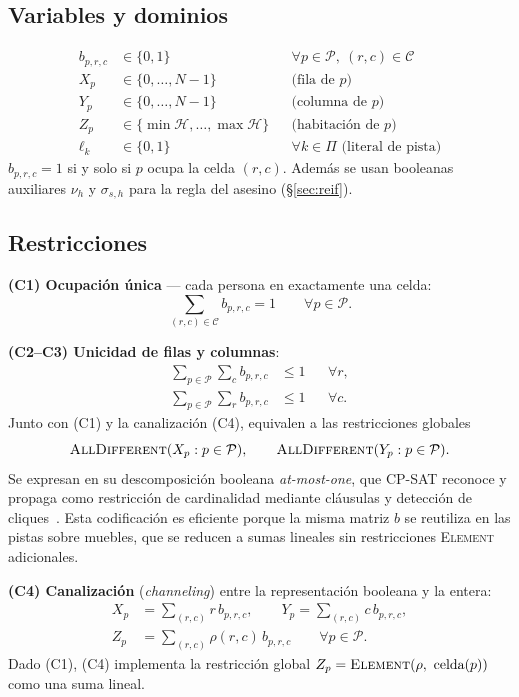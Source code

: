 \documentclass[conference,a4paper]{IEEEtran}
\newcommand{\AllDiff}{\textsc{AllDifferent}}
\begin{document}
\subsection{Variables y dominios}
\begin{align}
  b_{p,r,c} &\in \{0,1\} && \forall p\in\mathcal{P},\ (r,c)\in\mathcal{C}\\
  X_p &\in \{0,\dots,N-1\} && \text{(fila de } p)\\
  Y_p &\in \{0,\dots,N-1\} && \text{(columna de } p)\\
  Z_p &\in \{\min\mathcal{H},\dots,\max\mathcal{H}\} && \text{(habitación de } p)\\
  \ell_k &\in \{0,1\} && \forall k\in\Pi \text{ (literal de pista)}
\end{align}
$b_{p,r,c}=1$ si y solo si $p$ ocupa la celda $(r,c)$. Además se usan booleanas auxiliares
$\nu_h$ y $\sigma_{s,h}$ para la regla del asesino (\S\ref{sec:reif}).

\subsection{Restricciones}

\textbf{(C1) Ocupación única} --- cada persona en exactamente una celda:
\begin{equation}
  \textstyle\sum_{(r,c)\in\mathcal{C}} b_{p,r,c} = 1 \qquad \forall p\in\mathcal{P}.
\end{equation}

\textbf{(C2--C3) Unicidad de filas y columnas}:
\begin{align}
  \textstyle\sum_{p\in\mathcal{P}}\sum_{c} b_{p,r,c} &\le 1 && \forall r,\\
  \textstyle\sum_{p\in\mathcal{P}}\sum_{r} b_{p,r,c} &\le 1 && \forall c.
\end{align}
Junto con (C1) y la canalización (C4), equivalen a las restricciones globales
\begin{equation}
  \AllDiff(X_p : p\in\mathcal{P}),\qquad \AllDiff(Y_p : p\in\mathcal{P}).
\end{equation}
Se expresan en su descomposición booleana \emph{at-most-one}, que CP-SAT reconoce y
propaga como restricción de cardinalidad mediante cláusulas y detección de
cliques~\cite{perron2023cpsat}. Esta codificación es eficiente porque la misma matriz $b$ se
reutiliza en las pistas sobre muebles, que se reducen a sumas lineales sin restricciones
\textsc{Element} adicionales.

\textbf{(C4) Canalización} (\emph{channeling}) entre la representación booleana y la
entera:
\begin{align}
  X_p &= \textstyle\sum_{(r,c)} r\, b_{p,r,c}, \qquad
  Y_p = \textstyle\sum_{(r,c)} c\, b_{p,r,c},\\
  Z_p &= \textstyle\sum_{(r,c)} \rho(r,c)\, b_{p,r,c} \qquad \forall p\in\mathcal{P}.
\end{align}
Dado (C1), (C4) implementa la restricción global
$Z_p = \textsc{Element}(\rho,\ \text{celda}(p))$ como una suma lineal.
\end{document}
